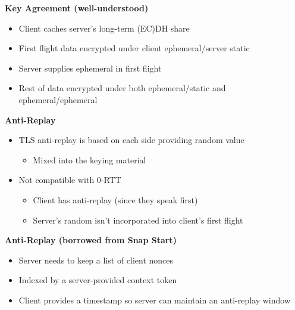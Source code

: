 \documentclass[helvetica]{seminar}
\newcommand{\heading}[1]{%
  \begin{center} 
    \large\bf 
    #1 
  \end{center} 
  \vspace{.4 in}}
\begin{document}
\begin{slide}
\heading{Key Agreement (well-understood)}

\begin{itemize}
\item Client caches server's long-term (EC)DH share
\item First flight data encrypted under client ephemeral/server static
\item Server supplies ephemeral in first flight
\item Rest of data encrypted under both ephemeral/static and ephemeral/ephemeral
\end{itemize}
\end{slide}


\begin{slide}
\heading{Anti-Replay}

\begin{itemize}
\item TLS anti-replay is based on each side providing random value
  \begin{itemize}
  \item Mixed into the keying material
  \end{itemize}

\item Not compatible with 0-RTT
  \begin{itemize}
  \item Client has anti-replay (since they speak first)
  \item Server's random isn't incorporated into client's first flight
  \end{itemize}
\end{itemize}
\end{slide}



\begin{slide}
\heading{Anti-Replay (borrowed from Snap Start)}

\begin{itemize}
\item Server needs to keep a list of client nonces
\item Indexed by a server-provided context token
\item Client provides a timestamp so server can maintain an anti-replay window
\end{itemize}
\end{slide}
\end{document}

